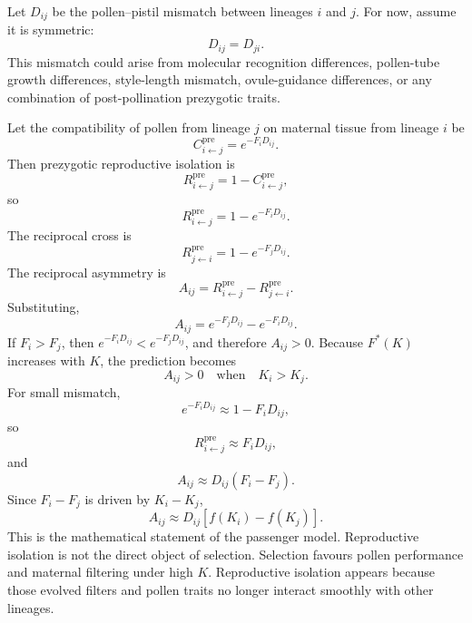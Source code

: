 \documentclass[11pt]{article}
\newcommand{\Rpre}{R^{\mathrm{pre}}}
\begin{document}
Let \(D_{ij}\) be the pollen--pistil mismatch between lineages \(i\) and \(j\). For now, assume it is symmetric:
\begin{equation}
D_{ij}=D_{ji}.
\end{equation}
This mismatch could arise from molecular recognition differences, pollen-tube growth differences, style-length mismatch, ovule-guidance differences, or any combination of post-pollination prezygotic traits.

Let the compatibility of pollen from lineage \(j\) on maternal tissue from lineage \(i\) be
\begin{equation}
C^{\mathrm{pre}}_{i\leftarrow j}=e^{-F_iD_{ij}}.
\end{equation}
Then prezygotic reproductive isolation is
\begin{equation}
\Rpre_{i\leftarrow j}=1-C^{\mathrm{pre}}_{i\leftarrow j},
\end{equation}
so
\begin{equation}
\Rpre_{i\leftarrow j}=1-e^{-F_iD_{ij}}.
\label{eq:Rpre}
\end{equation}
The reciprocal cross is
\begin{equation}
\Rpre_{j\leftarrow i}=1-e^{-F_jD_{ij}}.
\end{equation}
The reciprocal asymmetry is
\begin{equation}
A_{ij}=\Rpre_{i\leftarrow j}-\Rpre_{j\leftarrow i}.
\end{equation}
Substituting,
\begin{equation}
A_{ij}=e^{-F_jD_{ij}}-e^{-F_iD_{ij}}.
\label{eq:asymmetry}
\end{equation}
If \(F_i>F_j\), then \(e^{-F_iD_{ij}}<e^{-F_jD_{ij}}\), and therefore \(A_{ij}>0\). Because \(F^*(K)\) increases with \(K\), the prediction becomes
\begin{equation}
A_{ij}>0 \quad \text{when} \quad K_i>K_j.
\label{eq:asymmetry_prediction}
\end{equation}
For small mismatch,
\begin{equation}
e^{-F_iD_{ij}} \approx 1-F_iD_{ij},
\end{equation}
so
\begin{equation}
\Rpre_{i\leftarrow j} \approx F_iD_{ij},
\end{equation}
and
\begin{equation}
A_{ij} \approx D_{ij}(F_i-F_j).
\label{eq:small_mismatch_asymmetry}
\end{equation}
Since \(F_i-F_j\) is driven by \(K_i-K_j\),
\begin{equation}
A_{ij} \approx D_{ij}\left[f(K_i)-f(K_j)\right].
\end{equation}
This is the mathematical statement of the passenger model. Reproductive isolation is not the direct object of selection. Selection favours pollen performance and maternal filtering under high \(K\). Reproductive isolation appears because those evolved filters and pollen traits no longer interact smoothly with other lineages.
\end{document}

